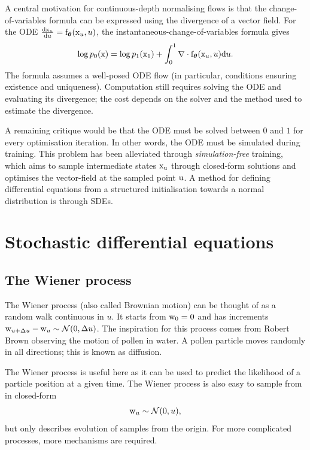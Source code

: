 A central motivation for continuous-depth normalising flows is that the change-of-variables formula can be expressed using the divergence of a vector field. For the \ac{ODE} $\frac{\mathrm{d}{\textnormal{x}}_u}{\mathrm{d} u}={\textnormal{f}}_{\bm{\theta}}({\textnormal{x}}_u,u)$, the instantaneous-change-of-variables formula \cite{NEURIPS2018_69386f6b, song2021sde} gives
\[
\log p_0({\textnormal{x}})=\log p_1({\textnormal{x}}_1) + \int_0^1\nabla\cdot{\textnormal{f}}_{\bm{\theta}}({\textnormal{x}}_u,u)\mathrm{d} u.
\label{eq:cnfll}
\]
The formula assumes a well-posed \ac{ODE} flow (in particular, conditions ensuring existence and uniqueness). Computation still requires solving the \ac{ODE} and evaluating its divergence; the cost depends on the solver and the method used to estimate the divergence.

A remaining critique would be that the \ac{ODE} must be solved between $0$ and $1$ for every optimisation iteration. In other words, the \ac{ODE} must be simulated during training. This problem has been alleviated through \textit{simulation-free} training, which aims to sample intermediate states ${\textnormal{x}}_{\textnormal{u}}$ through closed-form solutions and optimises the vector-field at the sampled point ${\textnormal{u}}$. A method for defining differential equations from a structured initialisation towards a normal distribution is through \acp{SDE}.

\section{Stochastic differential equations}
\subsection{The Wiener process}
The Wiener process (also called Brownian motion) can be thought of as a random walk continuous in $u$. It starts from ${\textnormal{w}}_0=0$ and has increments ${\textnormal{w}}_{u+\Delta u}-{\textnormal{w}}_u\sim\mathcal N(0,\Delta u)$. The inspiration for this process comes from Robert Brown observing the motion of pollen in water. A pollen particle moves randomly in all directions; this is known as diffusion.

The Wiener process is useful here as it can be used to predict the likelihood of a particle position at a given time. The Wiener process is also easy to sample from in closed-form
\[
{\textnormal{w}}_u\sim\mathcal{N}(0,u),
\]
but only describes evolution of samples from the origin. For more complicated processes, more mechanisms are required.

